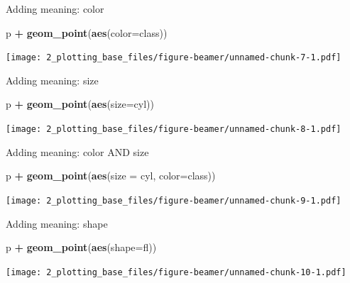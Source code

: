\documentclass[
  ignorenonframetext,
]{beamer}
\newenvironment{Shaded}{\begin{snugshade}}{\end{snugshade}}
\newcommand{\DataTypeTok}[1]{\textcolor[rgb]{0.13,0.29,0.53}{#1}}
\newcommand{\KeywordTok}[1]{\textcolor[rgb]{0.13,0.29,0.53}{\textbf{#1}}}
\newcommand{\NormalTok}[1]{#1}
\newcommand{\OperatorTok}[1]{\textcolor[rgb]{0.81,0.36,0.00}{\textbf{#1}}}
\newcommand{\StringTok}[1]{\textcolor[rgb]{0.31,0.60,0.02}{#1}}
\begin{document}
\begin{frame}[fragile]{Adding meaning: color}
\protect\hypertarget{adding-meaning-color}{}

\begin{Shaded}
\begin{Highlighting}[]
\NormalTok{p }\OperatorTok{+}\StringTok{ }\KeywordTok{geom_point}\NormalTok{(}\KeywordTok{aes}\NormalTok{(}\DataTypeTok{color=}\NormalTok{class))}
\end{Highlighting}
\end{Shaded}

\texttt{[image: 2\_plotting\_base\_files/figure-beamer/unnamed-chunk-7-1.pdf]}

\end{frame}

\begin{frame}[fragile]{Adding meaning: size}
\protect\hypertarget{adding-meaning-size}{}

\begin{Shaded}
\begin{Highlighting}[]
\NormalTok{p }\OperatorTok{+}\StringTok{ }\KeywordTok{geom_point}\NormalTok{(}\KeywordTok{aes}\NormalTok{(}\DataTypeTok{size=}\NormalTok{cyl))}
\end{Highlighting}
\end{Shaded}

\texttt{[image: 2\_plotting\_base\_files/figure-beamer/unnamed-chunk-8-1.pdf]}

\end{frame}

\begin{frame}[fragile]{Adding meaning: color AND size}
\protect\hypertarget{adding-meaning-color-and-size}{}

\begin{Shaded}
\begin{Highlighting}[]
\NormalTok{p }\OperatorTok{+}\StringTok{ }\KeywordTok{geom_point}\NormalTok{(}\KeywordTok{aes}\NormalTok{(}\DataTypeTok{size =}\NormalTok{ cyl, }\DataTypeTok{color=}\NormalTok{class))}
\end{Highlighting}
\end{Shaded}

\texttt{[image: 2\_plotting\_base\_files/figure-beamer/unnamed-chunk-9-1.pdf]}

\end{frame}

\begin{frame}[fragile]{Adding meaning: shape}
\protect\hypertarget{adding-meaning-shape}{}

\begin{Shaded}
\begin{Highlighting}[]
\NormalTok{p }\OperatorTok{+}\StringTok{ }\KeywordTok{geom_point}\NormalTok{(}\KeywordTok{aes}\NormalTok{(}\DataTypeTok{shape=}\NormalTok{fl))}
\end{Highlighting}
\end{Shaded}

\texttt{[image: 2\_plotting\_base\_files/figure-beamer/unnamed-chunk-10-1.pdf]}

\end{frame}
\end{document}
